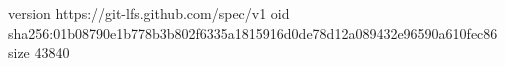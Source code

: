 version https://git-lfs.github.com/spec/v1
oid sha256:01b08790e1b778b3b802f6335a1815916d0de78d12a089432e96590a610fec86
size 43840

